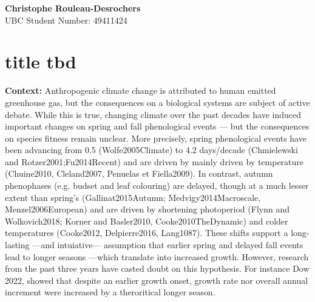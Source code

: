 \documentclass[12pt]{article}
\begin{document}
{\small
\textbf{Christophe Rouleau-Desrochers} \\
UBC Student Number: 49411424
}
\vspace{0cm}

\section*{title tbd}



\textbf {Context:} Anthropogenic climate change is attributed to human emitted greenhouse gas, but the consequences on a biological systems are subject of active debate. While this is true, changing climate over the past decades have induced important changes on spring and fall phenological events --- but the consequences on species fitness remain unclear. More precisely, spring phenological events have been advancing from 0.5 (Wolfe2005Climate) to 4.2 days/decade (Chmielewski and Rotzer2001;Fu2014Recent) and are driven by mainly driven by temperature (Chuine2010, Cleland2007, Penuelas et Fiella2009). In contrast, autumn phenophases (e.g. budset and leaf colouring) are delayed, though at a much lesser extent than spring's (Gallinat2015Autumn; Medvigy2014Macroscale, Menzel2006European) and are driven by shortening photoperiod (Flynn and Wolkovich2018; Korner and Basler2010, Cooke2010TheDynamic) and colder temperatures (Cooke2012, Delpierre2016, Lang1087). These shifts support a long-lasting ---and intuiative---  assumption that earlier spring and delayed fall events lead to longer seasons ---which translate into increased growth. However, research from the past three years have casted doubt on this hypothesis. For instance Dow 2022, showed that despite an earlier growth onset, growth rate nor overall annual increment were increased by a theroritical longer season. 
\end{document}
